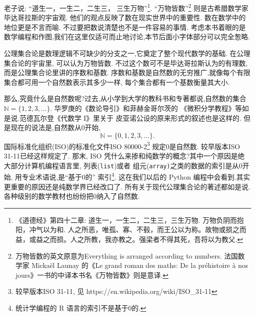 老子说: “道生一，一生二，二生三，
三生万物”\footnote{《道德经》第四十二章: 道生一，一生二，二生三，三生万物. 万物负阴而抱阳，冲气以为和. 人之所恶，唯孤、寡、不毂，而王公以为称。故物或损之而益，或益之而损。人之所教，我亦教之。强梁者不得其死，吾将以为教父.}.
“万物皆数”\footnote{万物皆数的英文原意为Everything is arranged according to numbers. 
	法国数学家 Mickaël Launay 的《Le grand roman des maths: De la préhistoire à nos jours》一书的中译本书名《万物皆数》则是意译.}
则是古希腊数学家毕达哥拉斯的宇宙观. 他们的观点反映了数在现实世界中的重要性. 数在数学中的地位更是不言而喻.
不过要把数说清楚也不是一件容易的事情. 考虑本书着眼的是数学编程和作图,我们在这里仅适可而止地讨论,本节后面小字体部分可以完全怱略. 

公理集合论是数理逻辑不可缺少的分支之一,它奠定了整个现代数学的基础. 在公理集合论的宇宙里, 可以认为万物皆数. 
不过这个数可不是毕达哥拉斯认为的有理数, 而是公理集合论里讲的序数和基数.
序数和基数是自然数的无穷推广,就像每个有限集合都可用一个自然数表示其多少一样,
每个集合都有一个基数衡量其大小.

那么,究竟什么是自然数呢?过去,从小学到大学的教科书和专著都说,自然数的集合$\mathbb{N} = \{1, 2, 3, \dots\}$.
华罗庚的《数论导引》\cite{HuaL}和菲赫金哥尔茨的
《微积分学教程》\cite{FeiH1}等如是说.范德瓦尔登《代数学 I》\cite{derWaerden}里关于
皮亚诺公设的原来形式的叙述也是这样的.
但是现在的说法是,自然数从0开始, 
$$\mathbb{N} = \{0,1, 2, 3, \dots\}.$$
 国际标准化组织(ISO)的标准化文件ISO 80000-2\footnote{较早版本ISO 31-11, 见  https://en.wikipedia.org/wiki/ISO\_31-11}
 规定0是自然数. 较早版本ISO 31-11已经这样规定了.
 那末, ISO 凭什么来掺和纯数学的概念?其中一个原因是绝大部分计算机编程语言里,
 列表(\texttt{list})或者
 组元(\texttt{array)}之类的数据的索引是从0开始,
 用专业术语说,是“基于0的”
 索引\footnote{统计学编程的 R 语言的索引不是基于0的.}.
 这在我们以后的 Python 编程中会看到.其实更重要的原因还是纯数学界已经改口了.
 所有关于现代公理集合论的著述都如是说\cite{HalmosP}\cite{KelleyJ}\cite{JiangJi}. 各种级别的数学教材也纷纷把0纳入了自然数.
 
